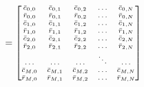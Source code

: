 \documentclass[aspectratio=169]{beamer}
\begin{document}
\begin{frame}
	\begin{align*}
	=
	\scriptsize
	\begin{bmatrix}
	\bar{c}_{0, 0} & \bar{c}_{0, 1} &\bar{c}_{0, 2} & \ldots & \bar{c}_{0, N} \\
	\bar{r}_{0, 0} & \bar{r}_{0, 1} &\bar{r}_{0, 2} & \ldots & \bar{r}_{0, N} \\
	\bar{c}_{1, 0} & \bar{c}_{1, 1} &\bar{c}_{1, 2} & \ldots & \bar{c}_{1, N} \\
	\bar{r}_{1, 0} & \bar{r}_{1, 1} &\bar{r}_{1, 2} & \ldots & \bar{r}_{1, N} \\
	\bar{c}_{2, 0} & \bar{c}_{2, 1} &\bar{c}_{2, 2} & \ldots & \bar{c}_{2, N} \\
	\bar{r}_{2, 0} & \bar{r}_{2, 1} &\bar{r}_{2, 2} & \ldots & \bar{r}_{2, N} \\
	\ldots & \ldots & \ldots & \ddots & \ldots \\
	\bar{c}_{M, 0} & \bar{c}_{M, 1} &\bar{c}_{M, 2} & \ldots & \bar{c}_{M, N} \\
	\bar{r}_{M, 0} & \bar{r}_{M, 1} &\bar{r}_{M, 2} & \ldots & \bar{r}_{M, N}
	\end{bmatrix}
	\end{align*}
\end{frame}
\end{document}

